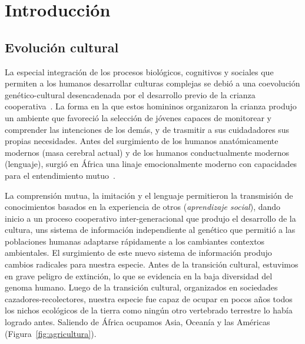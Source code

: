 \documentclass[a4paper,10pt]{book}
\theoremstyle{definition}
\begin{document}
\chapter{Introducci\'on} \label{ch:evo}

\section{Evoluci\'on cultural}

La especial integraci\'on de los procesos biol\'ogicos, cognitivos y sociales que permiten a los humanos desarrollar culturas complejas se debi\'o a una coevoluci\'on gen\'etico-cultural desencadenada por el desarrollo previo de la crianza cooperativa~\cite{hrdy2020-emotionallyModern}.
%
La forma en la que estos homininos organizaron la crianza produjo un ambiente que favoreci\'o la selecci\'on de j\'ovenes capaces de monitorear y comprender las intenciones de los dem\'as, y de trasmitir a sus cuidadadores sus propias necesidades.
Antes del surgimiento de los humanos anat\'omicamente modernos (masa cerebral actual) y de los humanos conductualmente modernos (lenguaje), surgi\'o en África una linaje emocionalmente moderno con capacidades para el entendimiento mutuo~\cite{hrdy2020-emotionallyModern}.


La comprensi\'on mutua, la imitaci\'on y el lenguaje permitieron la transmisi\'on de conocimientos basados en la experiencia de otros (\emph{aprendizaje social}), dando inicio a un proceso cooperativo inter-generacional que produjo el desarrollo de la cultura, uns sistema de informaci\'on independiente al gen\'etico que permiti\'o a las poblaciones humanas adaptarse r\'apidamente a los cambiantes contextos ambientales.
%
El surgimiento de este nuevo sistema de informaci\'on produjo cambios radicales para nuestra especie.
%
Antes de la transici\'on cultural, estuvimos en grave peligro de extinci\'on, lo que se evidencia en la baja diversidad del genoma humano.
%
Luego de la transici\'on cultural, organizados en sociedades cazadores-recolectores, nuestra especie fue capaz de ocupar en pocos a\~nos todos los nichos ecol\'ogicos de la tierra como ning\'un otro vertebrado terrestre lo hab\'ia logrado antes.
%
Saliendo de África ocupamos Asia, Ocean\'ia y las Am\'ericas (Figura~\ref{fig:agricultura}).
\end{document}
